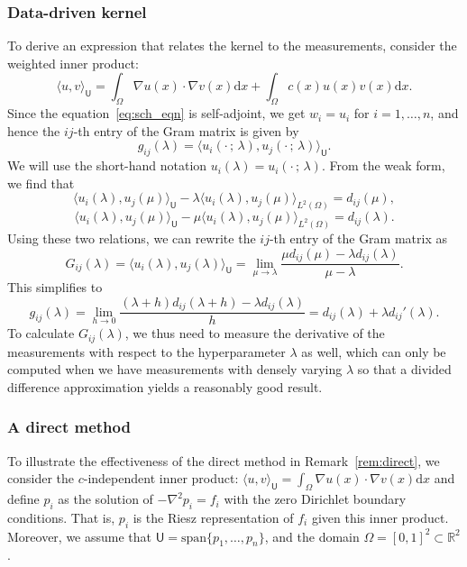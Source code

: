 \documentclass[12pt]{amsart}
\newcommand{\yy}[1]{\textcolor{blue}{{YY: #1}}}
\begin{document}
\subsubsection{Data-driven kernel}
To derive an expression that relates the kernel to the measurements, consider the weighted inner product:
$$\langle u,v\rangle_{\mathsf{U}} = \int_{\Omega} \nabla u(x)\cdot\nabla v(x)\mathrm{d}x + \int_{\Omega} c(x)u(x)v(x)\mathrm{d}x.$$
Since the equation~\eqref{eq:sch_eqn} is self-adjoint, we get $w_i = u_i$ for $i=1,\ldots,n$, and hence the $ij$-th entry of the Gram matrix is given by
$$g_{ij}(\lambda) = \langle u_i(\cdot \, ;\, \lambda), u_j(\cdot\,;\,\lambda)\rangle_\mathsf{U}.$$
We will use the short-hand notation $u_i(\lambda) = u_i(\cdot \, ;\, \lambda)$. From the weak form, we find that 
$$\langle u_i(\lambda), u_j(\mu)\rangle_{\mathsf{U}} - \lambda\langle u_i(\lambda),u_j(\mu)\rangle_{L^2(\Omega)} = d_{ij}(\mu),$$
$$\langle u_i(\lambda), u_j(\mu)\rangle_{\mathsf{U}} - \mu\langle u_i(\lambda),u_j(\mu)\rangle_{L^2(\Omega)} = d_{ij}(\lambda).$$
Using these two relations, we can rewrite the $ij$-th entry of the Gram matrix as
$$G_{ij}(\lambda)=\langle u_i(\lambda), u_j(\lambda)\rangle_{\mathsf{U}} = \lim_{\mu\rightarrow\lambda}\frac{\mu d_{ij}(\mu) - \lambda d_{ij}(\lambda)}{\mu-\lambda}.$$
This simplifies to
$$
g_{ij}(\lambda) = \lim_{h\rightarrow 0}\frac{(\lambda + h)d_{ij}(\lambda+h) - \lambda d_{ij}(\lambda)}{h} = d_{ij}(\lambda)+\lambda d_{ij}'(\lambda).
$$
To calculate $G_{ij}(\lambda)$,  we thus need to measure the derivative of the measurements with respect to the hyperparameter $\lambda$ as well, which can only be computed when we have measurements with densely varying $\lambda$ so that a divided difference approximation yields a reasonably good result. %

\subsubsection{A direct method}
To illustrate the effectiveness of the direct method in Remark~\ref{rem:direct}, we consider the $c$-independent inner product: $\langle u, v\rangle_{\mathsf{U}} = \int_{\Omega} \nabla u(x)\cdot\nabla v(x) \mathrm{d}x$ and define $p_i$ as the solution of $- \nabla^2 p_i = f_i$ with the zero Dirichlet boundary conditions. That is, $p_i$ is the Riesz representation of $f_i$ given this inner product. Moreover, we assume that $\mathsf{U} = \text{span}\{p_1,\ldots, p_n\}$, and the domain $\Omega = [0,1]^2 \subset \mathbb{R}^2$.
\end{document}
